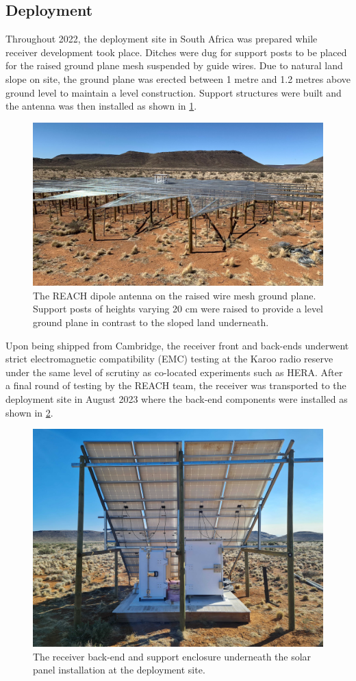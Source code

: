 \subsection{Deployment}
Throughout 2022, the deployment site in South Africa was prepared while receiver development took place. Ditches were dug for support posts to be placed for the raised ground plane mesh suspended by guide wires. Due to natural land slope on site, the ground plane was erected between 1 metre and 1.2 metres above ground level to maintain a level construction. Support structures were built and the antenna was then installed as shown in \cref{fig:ground_plane}.
\begin{figure}
    \centering
    \includegraphics[width=\textwidth]{ground_plane}
    \caption{The REACH dipole antenna on the raised wire mesh ground plane. Support posts of heights varying 20 cm were raised to provide a level ground plane in contrast to the sloped land underneath.}
    \label{fig:ground_plane}
\end{figure}
Upon being shipped from Cambridge, the receiver front and back-ends underwent strict electromagnetic compatibility (EMC) testing at the Karoo radio reserve under the same level of scrutiny as co-located experiments such as HERA. After a final round of testing by the REACH team, the receiver was transported to the deployment site in August 2023 where the back-end components were installed as shown in \cref{fig:deploy_backend}.
\begin{figure}
    \centering
    \includegraphics[width=.8\textwidth]{deploy_backend.jpg}
    \caption{The receiver back-end and support enclosure underneath the solar panel installation at the deployment site.}
    \label{fig:deploy_backend}
\end{figure}


